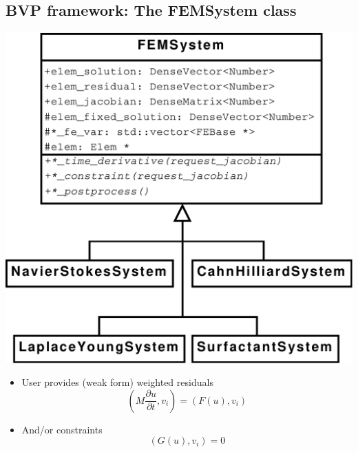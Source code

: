 \subsection*{BVP framework: The FEMSystem class}

\begin{frame}
  \begin{minipage}[h]{.45\textwidth}
    \begin{center}
      \includegraphics[width=.9\textwidth]{figures/FEMSystem}
    \end{center}
  \end{minipage}
  \begin{minipage}[h]{.5\textwidth}
      \begin{itemize}
      \item
        User provides (weak form) weighted residuals
        \begin{equation}
          \nonumber
        \left(M\frac{\partial u}{\partial t}, v_i \right) =
        \left(F\left(u\right), v_i\right)
          \end{equation}
        \item And/or constraints
        \begin{equation}
          \nonumber
          \left(G\left(u\right), v_i\right) = 0
        \end{equation}
      \end{itemize}
  \end{minipage}
\end{frame}
